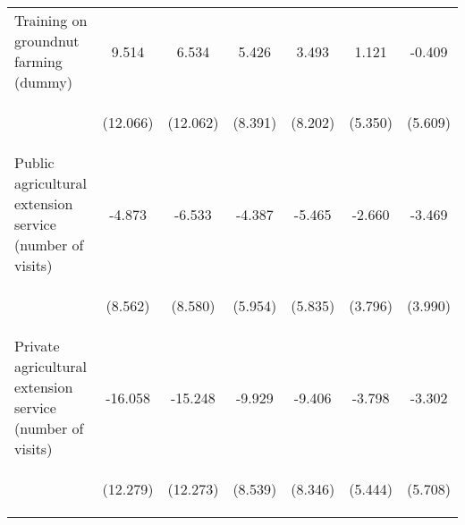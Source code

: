 \begin{center}
\begin{tabular}{lcccccc}
Training on groundnut farming (dummy) & 9.514 & 6.534 & 5.426 & 3.493 & 1.121 & -0.409 \\
\vspace{4pt} & \begin{footnotesize}(12.066)\end{footnotesize} & \begin{footnotesize}(12.062)\end{footnotesize} & \begin{footnotesize}(8.391)\end{footnotesize} & \begin{footnotesize}(8.202)\end{footnotesize} & \begin{footnotesize}(5.350)\end{footnotesize} & \begin{footnotesize}(5.609)\end{footnotesize} \\
Public agricultural extension service (number of visits) & -4.873 & -6.533 & -4.387 & -5.465 & -2.660 & -3.469 \\
\vspace{4pt} & \begin{footnotesize}(8.562)\end{footnotesize} & \begin{footnotesize}(8.580)\end{footnotesize} & \begin{footnotesize}(5.954)\end{footnotesize} & \begin{footnotesize}(5.835)\end{footnotesize} & \begin{footnotesize}(3.796)\end{footnotesize} & \begin{footnotesize}(3.990)\end{footnotesize} \\
Private agricultural extension service (number of visits) & -16.058 & -15.248 & -9.929 & -9.406 & -3.798 & -3.302 \\
\vspace{4pt} & \begin{footnotesize}(12.279)\end{footnotesize} & \begin{footnotesize}(12.273)\end{footnotesize} & \begin{footnotesize}(8.539)\end{footnotesize} & \begin{footnotesize}(8.346)\end{footnotesize} & \begin{footnotesize}(5.444)\end{footnotesize} & \begin{footnotesize}(5.708)\end{footnotesize} \\

\end{tabular}
\end{center}
